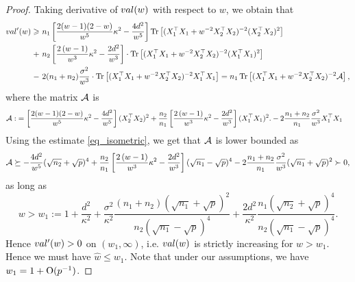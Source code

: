 \begin{proof}
Taking derivative of $\val(w)$ with respect to $w$, we obtain that
\begin{align*}
\val'(w) \ge &~ n_1\left[ \frac{2(w-1)(2-w)}{w^5}\kappa^2 - \frac{4d^2}{w^5}\right] \tr\left[( X_1^{\top}X_1 +w^{-2}X_2^{\top}X_2)^{-2} (X_2^{\top}X_2)^2\right]   \\
+&~ n_2\left[\frac{2\left( w-1\right)}{w^3}\kappa^2 - \frac{2d^2}{w^3} \right]\cdot \tr\left[( X_1^{\top}X_1 +w^{-2}X_2^{\top}X_2)^{-2} (X_1^{\top}X_1)^2\right] \nonumber\\
		-&~ 2(n_1+n_2) \frac{\sigma^2}{w^3} \cdot \bigtr{(X_1^{\top}X_1 + w^{-2}X_2^{\top}X_2)^{-2} X_1^\top X_1  } = n_1 \bigtr{(X_1^{\top}X_1 + w^{-2}X_2^{\top}X_2)^{-2} \cal A },
\end{align*}
where the matrix $\cal A$ is
\begin{align*}
\cal A :&= \left[ \frac{2(w-1)(2-w)}{w^5}\kappa^2 - \frac{4d^2}{w^5}\right](X_2^{\top}X_2)^2 + \frac{n_2}{n_1} \left[\frac{2\left( w-1\right)}{w^3}\kappa^2 - \frac{2d^2}{w^3} \right](X_1^{\top}X_1)^2. - 2\frac{n_1+n_2}{n_1}\frac{\sigma^2}{w^3}X_1^\top X_1
\end{align*}
Using the estimate \eqref{eq_isometric}, we get that $\cal A$ is lower bounded as
\begin{align*}
\cal A \succeq - \frac{4d^2}{w^5}(\sqrt{n_2}+\sqrt{p})^4 + \frac{n_2}{n_1} \left[\frac{2\left( w-1\right)}{w^3}\kappa^2 - \frac{2d^2}{w^3} \right](\sqrt{n_1}-\sqrt{p})^4 - 2\frac{n_1+n_2}{n_1}\frac{\sigma^2}{w^3}(\sqrt{n_1}+\sqrt{p})^2\succ 0,
\end{align*}
as long as
$$w> w_1:=1 +\frac{d^2}{\kappa^2}+ \frac{\sigma^2}{\kappa^2}\frac{(n_1+n_2)(\sqrt{n_1}+\sqrt{p})^2}{n_2(\sqrt{n_1}-\sqrt{p})^4}+ \frac{2d^2}{\kappa^2}\frac{n_1(\sqrt{n_2}+\sqrt{p})^4}{n_2(\sqrt{n_1}-\sqrt{p})^4}.$$
Hence $\val'(w)>0$ on $(w_1,\infty)$, i.e. $\val(w)$ is strictly increasing for $w>w_1$. Hence we must have $\hat w\le w_1$. Note that under our assumptions, we have $w_1=1+\OO(p^{-1})$.


\end{proof}
